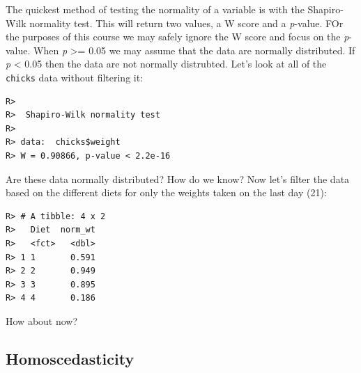 \documentclass[english,10pt,a4paper,oneside]{book}
\newenvironment{Shaded}{\begin{snugshade}}{\end{snugshade}}
\newcommand{\DataTypeTok}[1]{\textcolor[rgb]{0.13,0.29,0.53}{#1}}
\newcommand{\DecValTok}[1]{\textcolor[rgb]{0.00,0.00,0.81}{#1}}
\newcommand{\KeywordTok}[1]{\textcolor[rgb]{0.13,0.29,0.53}{\textbf{#1}}}
\newcommand{\NormalTok}[1]{#1}
\newcommand{\OperatorTok}[1]{\textcolor[rgb]{0.81,0.36,0.00}{\textbf{#1}}}
\newcommand{\StringTok}[1]{\textcolor[rgb]{0.31,0.60,0.02}{#1}}
\theoremstyle{definition}
\theoremstyle{definition}
\theoremstyle{definition}
\theoremstyle{remark}
\begin{document}
The quickest method of testing the normality of a variable is with the
Shapiro-Wilk normality test. This will return two values, a W score and
a \emph{p}-value. FOr the purposes of this course we may safely ignore
the W score and focus on the \emph{p}-value. When \emph{p}
\textgreater{}= 0.05 we may assume that the data are normally
distributed. If \emph{p} \textless{} 0.05 then the data are not normally
distrubted. Let's look at all of the \texttt{chicks} data without
filtering it:

\begin{Shaded}
\end{Shaded}

\begin{verbatim}
R> 
R>  Shapiro-Wilk normality test
R> 
R> data:  chicks$weight
R> W = 0.90866, p-value < 2.2e-16
\end{verbatim}

Are these data normally distributed? How do we know? Now let's filter
the data based on the different diets for only the weights taken on the
last day (21):

\begin{Shaded}
\end{Shaded}

\begin{verbatim}
R> # A tibble: 4 x 2
R>   Diet  norm_wt
R>   <fct>   <dbl>
R> 1 1       0.591
R> 2 2       0.949
R> 3 3       0.895
R> 4 4       0.186
\end{verbatim}

How about now?

\hypertarget{homoscedasticity-1}{%
\subsection{Homoscedasticity}\label{homoscedasticity-1}}
\end{document}
